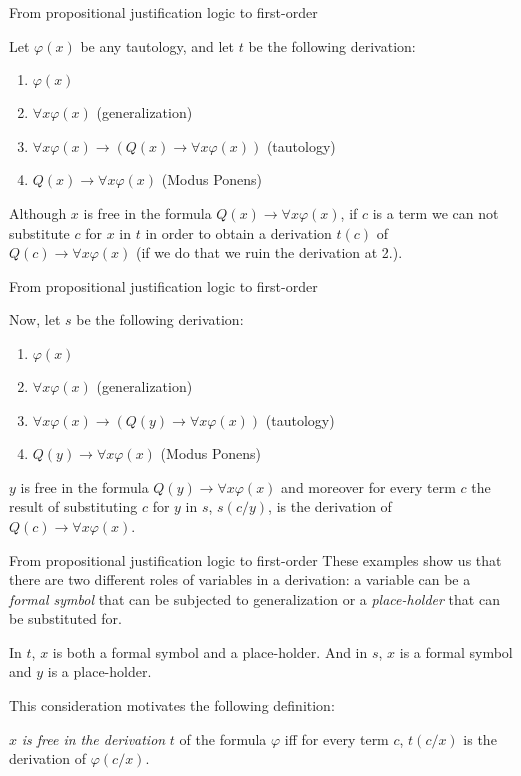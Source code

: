 \documentclass{beamer}
\theoremstyle{definition}
\newcommand{\impli}{\rightarrow}
\newcommand{\todo}{\forall}
\begin{document}
	
\begin{frame}{From propositional justification logic to first-order}

\qquad Let $\varphi(x)$ be any tautology, and let $t$ be the following derivation:

\begin{enumerate}[1.]
\item $\varphi(x)$ 
\item $\todo x \varphi(x)$                 (generalization)
\item $\todo x\varphi(x) \impli (Q(x) \impli \todo x\varphi(x))$ (tautology)
\item $Q(x) \impli \todo x\varphi(x)$ (Modus Ponens)
\end{enumerate}

\qquad Although $x$ is free in the formula $Q(x) \impli \todo x\varphi(x)$, if $c$ is a term we can not substitute $c$ for $x$ in $t$ in order to obtain a derivation $t(c)$ of $Q(c) \impli \todo x\varphi(x)$ (if we do that we ruin the derivation at 2.).
\end{frame}



\begin{frame}{From propositional justification logic to first-order}
	
\qquad Now, let $s$ be the following derivation:

\begin{enumerate}[1.]
\item $\varphi(x)$ 
\item $\todo x \varphi(x)$                 (generalization)
\item $\todo x\varphi(x) \impli (Q(y) \impli \todo x\varphi(x))$ (tautology)
\item $Q(y) \impli \todo x\varphi(x)$ (Modus Ponens)
\end{enumerate}
	
\qquad $y$ is free in the formula $Q(y) \impli \todo x\varphi(x)$ and moreover for every term $c$ the result of substituting $c$ for $y$ in $s$, $s(c/y)$, is the  derivation of $Q(c) \impli \todo x\varphi(x)$.
\end{frame}




\begin{frame}{From propositional justification logic to first-order}
\qquad These examples show us that there are two different roles of variables in a derivation: a variable can be a \textit{formal symbol} that can be subjected to generalization or a \textit{place-holder} that can be substituted for.

\qquad In $t$, $x$ is both a formal symbol and a place-holder. And in $s$, $x$ is a formal symbol and $y$ is a place-holder.

\qquad This consideration motivates the following definition:

\begin{center}
$x$ \textit{is free in the derivation} $t$ of the formula $\varphi$ iff for every term $c$, $t(c/x)$ is the derivation of $\varphi(c/x)$.
\end{center}

\end{frame}
\end{document}
